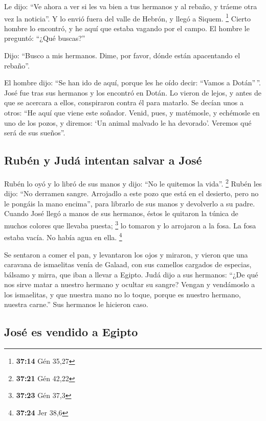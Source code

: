  Le dijo: ``Ve ahora a ver si les va bien a tus hermanos
y al rebaño, y tráeme otra vez la noticia''. Y lo envió fuera del valle
de Hebrón, y llegó a Siquem. \footnote{\textbf{37:14} Gén 35,27}
 Cierto hombre lo encontró, y he aquí que estaba vagando
por el campo. El hombre le preguntó: ``¿Qué buscas?''

 Dijo: ``Busco a mis hermanos. Dime, por favor, dónde
están apacentando el rebaño''.

 El hombre dijo: ``Se han ido de aquí, porque les he oído
decir: ``Vamos a Dotán''\,''. José fue tras sus hermanos y los encontró
en Dotán.  Lo vieron de lejos, y antes de que se acercara
a ellos, conspiraron contra él para matarlo.  Se decían
unos a otros: ``He aquí que viene este soñador.  Venid,
pues, y matémosle, y echémosle en uno de los pozos, y diremos: `Un
animal malvado le ha devorado'. Veremos qué será de sus sueños''.

\hypertarget{rubuxe9n-y-juduxe1-intentan-salvar-a-josuxe9}{%
\subsection{Rubén y Judá intentan salvar a
José}\label{rubuxe9n-y-juduxe1-intentan-salvar-a-josuxe9}}

 Rubén lo oyó y lo libró de sus manos y dijo: ``No le
quitemos la vida''. \footnote{\textbf{37:21} Gén 42,22} 
Rubén les dijo: ``No derramen sangre. Arrojadlo a este pozo que está en
el desierto, pero no le pongáis la mano encima'', para librarlo de sus
manos y devolverlo a su padre.  Cuando José llegó a manos
de sus hermanos, éstos le quitaron la túnica de muchos colores que
llevaba puesta; \footnote{\textbf{37:23} Gén 37,3}  lo
tomaron y lo arrojaron a la fosa. La fosa estaba vacía. No había agua en
ella. \footnote{\textbf{37:24} Jer 38,6}

 Se sentaron a comer el pan, y levantaron los ojos y
miraron, y vieron que una caravana de ismaelitas venía de Galaad, con
sus camellos cargados de especias, bálsamo y mirra, que iban a llevar a
Egipto.  Judá dijo a sus hermanos: ``¿De qué nos sirve
matar a nuestro hermano y ocultar su sangre?  Vengan y
vendámoslo a los ismaelitas, y que nuestra mano no lo toque, porque es
nuestro hermano, nuestra carne.'' Sus hermanos le hicieron caso.

\hypertarget{josuxe9-es-vendido-a-egipto}{%
\subsection{José es vendido a
Egipto}\label{josuxe9-es-vendido-a-egipto}}

